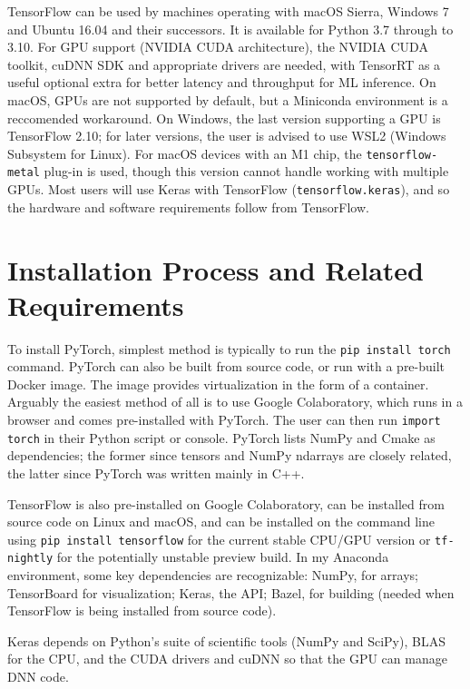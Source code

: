 \documentclass[conference]{IEEEtran}
\begin{document}
TensorFlow can be used by machines operating with macOS Sierra, Windows 7 and Ubuntu 16.04 and their successors. It is available for Python 3.7 through to 3.10. For GPU support (NVIDIA CUDA architecture), the NVIDIA CUDA toolkit, cuDNN SDK and appropriate drivers are needed, with TensorRT as a useful optional extra for better latency and throughput for ML inference. On macOS, GPUs are not supported by default, but a Miniconda environment is a reccomended workaround. On Windows, the last version supporting a GPU is TensorFlow 2.10; for later versions, the user is advised to use WSL2 (Windows Subsystem for Linux). For macOS devices with an M1 chip, the \verb+tensorflow-metal+ plug-in is used, though this version cannot handle working with multiple GPUs. Most users will use Keras with TensorFlow (\verb+tensorflow.keras+), and so the hardware and software requirements follow from TensorFlow. 

\section{Installation Process and Related Requirements}

To install PyTorch, simplest method is typically to run the \verb+pip install torch+ command. PyTorch can also be built from source code, or run with a pre-built Docker image. The image provides virtualization in the form of a container. Arguably the easiest method of all is to use Google Colaboratory, which runs in a browser and comes pre-installed with PyTorch. The user can then run \verb+import torch+ in their Python script or console. PyTorch lists NumPy and Cmake as dependencies; the former since tensors and NumPy ndarrays are closely related, the latter since PyTorch was written mainly in C++.

TensorFlow is also pre-installed on Google Colaboratory, can be installed from source code on Linux and macOS, and can be installed on the command line using \verb+pip install tensorflow+ for the current stable CPU/GPU version or \verb+tf-nightly+ for the potentially unstable preview build. In my Anaconda environment, some key dependencies are recognizable: NumPy, for arrays; TensorBoard for visualization; Keras, the API; Bazel, for building (needed when TensorFlow is being installed from source code). 

Keras depends on Python's suite of scientific tools (NumPy and SciPy), BLAS for the CPU, and the CUDA drivers and cuDNN so that the GPU can manage DNN code.
\end{document}
